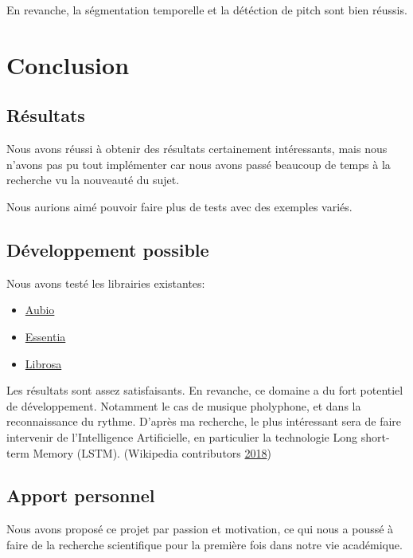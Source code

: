 \documentclass[french,]{article}
\providecommand{\tightlist}{%
  \setlength{\itemsep}{0pt}\setlength{\parskip}{0pt}}
\begin{document}
En revanche, la ségmentation temporelle et la détéction de pitch sont
bien réussis.

\pagebreak

\hypertarget{conclusion}{%
\section{Conclusion}\label{conclusion}}

\hypertarget{resultats-1}{%
\subsection{Résultats}\label{resultats-1}}

Nous avons réussi à obtenir des résultats certainement intéressants,
mais nous n'avons pas pu tout implémenter car nous avons passé beaucoup
de temps à la recherche vu la nouveauté du sujet.

Nous aurions aimé pouvoir faire plus de tests avec des exemples variés.

\hypertarget{developpement-possible}{%
\subsection{Développement possible}\label{developpement-possible}}

Nous avons testé les librairies existantes:

\begin{itemize}
\tightlist
\item
  \href{aubio.org}{Aubio}
\item
  \href{essentia.upf.edu}{Essentia}
\item
  \href{librosa.github.io}{Librosa}
\end{itemize}

Les résultats sont assez satisfaisants. En revanche, ce domaine a du
fort potentiel de développement. Notamment le cas de musique pholyphone,
et dans la reconnaissance du rythme. D'après ma recherche, le plus
intéressant sera de faire intervenir de l'Intelligence Artificielle, en
particulier la technologie Long short-term Memory (LSTM). (Wikipedia
contributors \protect\hyperlink{ref-lstm}{2018})

\hypertarget{apport-personnel}{%
\subsection{Apport personnel}\label{apport-personnel}}

Nous avons proposé ce projet par passion et motivation, ce qui nous a
poussé à faire de la recherche scientifique pour la première fois dans
notre vie académique.
\end{document}
